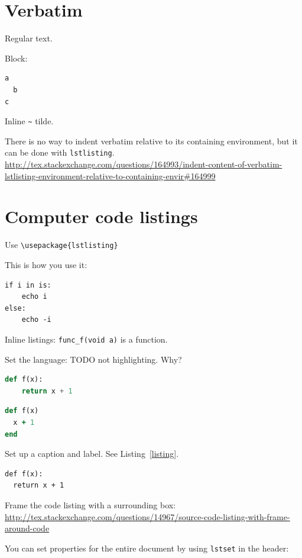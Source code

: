 \documentclass[12pt]{article}
\begin{document}
\section{Verbatim}\label{verbatim}

Regular text.

Block:

\begin{verbatim}
a
  b
c
\end{verbatim}

Inline \verb|~| tilde.

There is no way to indent verbatim relative to its containing environment, but it can be done with \lstinline|lstlisting|. \url{http://tex.stackexchange.com/questions/164993/indent-content-of-verbatim-lstlisting-environment-relative-to-containing-envir#164999}

\section{Computer code listings}\label{computer-code}

Use \lstinline|\usepackage{lstlisting}|

This is how you use it:

\begin{lstlisting}
if i in is:
    echo i
else:
    echo -i
\end{lstlisting}

Inline listings: \lstinline|func_f(void a)| is a function.

Set the language: TODO not highlighting. Why?

\begin{lstlisting}[language=Python]
def f(x):
    return x + 1
\end{lstlisting}

\begin{lstlisting}[language=Ruby]
def f(x)
  x + 1
end
\end{lstlisting}

Set up a caption and label. See Listing~\ref{listing}.

\begin{lstlisting}[label=listing, caption={Listing with caption and label.}]
def f(x):
  return x + 1
\end{lstlisting}

Frame the code listing with a surrounding box: \url{http://tex.stackexchange.com/questions/14967/source-code-listing-with-frame-around-code}

You can set properties for the entire document by using \lstinline|lstset| in the header:
\end{document}
